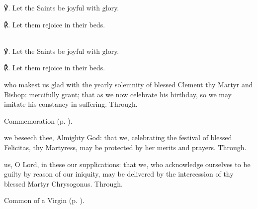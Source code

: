 ℣. Let the Saints be joyful with glory.

℟. Let them rejoice in their beds.



\secondEvensong
{}\\

℣. Let the Saints be joyful with glory.

℟. Let them rejoice in their beds.


\collect
{} who makest us glad with the yearly solemnity of blessed Clement thy Martyr and Bishop: mercifully grant; that as we now celebrate his birthday, so we may imitate his constancy in suffering. Through.

\begin{rubric}
    Commemoration  (p. \pageref{FelicityCollect}).
\end{rubric}



\memorialCollect\label{FelicityCollect}
 we beseech thee, Almighty God: that we, celebrating the festival of blessed Felicitas, thy Martyress, may be protected by her merits and prayers. Through.



\memorialCollect
{} us, O Lord, in these our supplications: that we, who acknowledge ourselves to be guilty by reason of our iniquity, may be delivered by the intercession of thy blessed Martyr Chrysogonus. Through.



\begin{rubric}
	Common of a Virgin (p. \pageref{CommonVirgin}).
\end{rubric}

